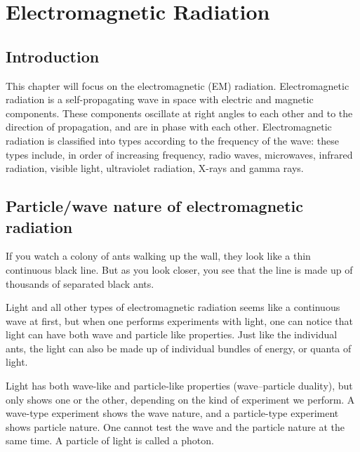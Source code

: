 



\chapter[EM Radiation]{Electromagnetic Radiation}
\label{p:em:emr12}

\section{Introduction}
This chapter will focus on the electromagnetic (EM) radiation. Electromagnetic radiation is a self-propagating wave in space with electric and magnetic components. These components oscillate at right angles to each other and to the direction of propagation, and are in phase with each other. Electromagnetic radiation is classified into types according to the frequency of the wave: these types include, in order of increasing frequency, radio waves, microwaves, infrared radiation, visible light, ultraviolet radiation, X-rays and gamma rays.

\section{Particle/wave nature of electromagnetic radiation}
\label{p:em:emr12:d}

If you watch a colony of ants walking up the wall, they look like a thin continuous black line.  But as you look closer, you see that the line is made up of thousands of separated black ants.

Light and all other types of electromagnetic radiation seems like a continuous wave at first, but when one performs experiments with light, one can notice that light can have both wave and particle like properties.  Just like the individual ants, the light can also be made up of individual bundles of energy, or quanta of light.

Light has both wave-like and particle-like properties (wave--particle duality), but only shows one or the other, depending on the kind of experiment we perform. A wave-type experiment shows the wave nature, and a particle-type experiment shows particle nature.  One cannot test the wave and the particle nature at the same time. A particle of light is called a photon.

